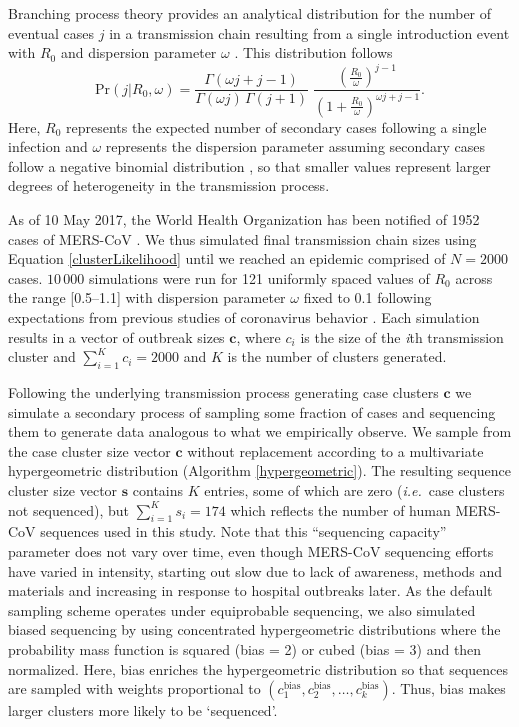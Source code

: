 \documentclass[11pt,oneside,letterpaper]{article}
\begin{document}
Branching process theory provides an analytical distribution for the number of eventual cases $j$ in a transmission chain resulting from a single introduction event with $R_0$ and dispersion parameter $\omega$ \citep{blumberg_inference_2013}.
This distribution follows
\begin{equation}
\mathrm{Pr}(j | R_{0}, \omega) = \frac{\Gamma(\omega j+j-1)}{\Gamma(\omega j) \, \Gamma(j+1)} \; \frac{(\frac{R_{0}}{\omega})^{j-1}}{(1+\frac{R_{0}}{\omega})^{\omega j+j-1}}.
\label{clusterLikelihood}
\end{equation}
Here, $R_0$ represents the expected number of secondary cases following a single infection and $\omega$ represents the dispersion parameter assuming secondary cases follow a negative binomial distribution \citep{lloyd-smith_superspreading_2005}, so that smaller values represent larger degrees of heterogeneity in the transmission process.

As of 10 May 2017, the World Health Organization has been notified of 1952 cases of MERS-CoV \citep{who_mers_summary_2017}.
We thus simulated final transmission chain sizes using Equation \ref{clusterLikelihood} until we reached an epidemic comprised of $N=2000$ cases.
$10\,000$ simulations were run for 121 uniformly spaced values of $R_0$ across the range [0.5--1.1] with dispersion parameter $\omega$ fixed to 0.1 following expectations from previous studies of coronavirus behavior \citep{lloyd-smith_superspreading_2005}.
Each simulation results in a vector of outbreak sizes $\mathbf{c}$, where $c_i$ is the size of the \textit{i}th transmission cluster and $\sum_{i=1}^{K} c_i = 2000$ and $K$ is the number of clusters generated.

Following the underlying transmission process generating case clusters $\mathbf{c}$ we simulate a secondary process of sampling some fraction of cases and sequencing them to generate data analogous to what we empirically observe.
We sample from the case cluster size vector $\mathbf{c}$ without replacement according to a multivariate hypergeometric distribution (Algorithm \ref{hypergeometric}).
The resulting sequence cluster size vector $\mathbf{s}$ contains $K$ entries, some of which are zero (\textit{i.e.}\ case clusters not sequenced), but $\sum_{i=1}^{K} s_i = 174$ which reflects the number of human MERS-CoV sequences used in this study.
Note that this ``sequencing capacity'' parameter does not vary over time, even though MERS-CoV sequencing efforts have varied in intensity, starting out slow due to lack of awareness, methods and materials and increasing in response to hospital outbreaks later.
As the default sampling scheme operates under equiprobable sequencing, we also simulated biased sequencing by using concentrated hypergeometric distributions where the probability mass function is squared (bias = 2) or cubed (bias = 3) and then normalized.
Here, bias enriches the hypergeometric distribution so that sequences are sampled with weights proportional to $(c_1^\mathrm{bias}, c_2^\mathrm{bias}, \ldots, c_k^\mathrm{bias})$.
Thus, bias makes larger clusters more likely to be `sequenced'.
\end{document}
